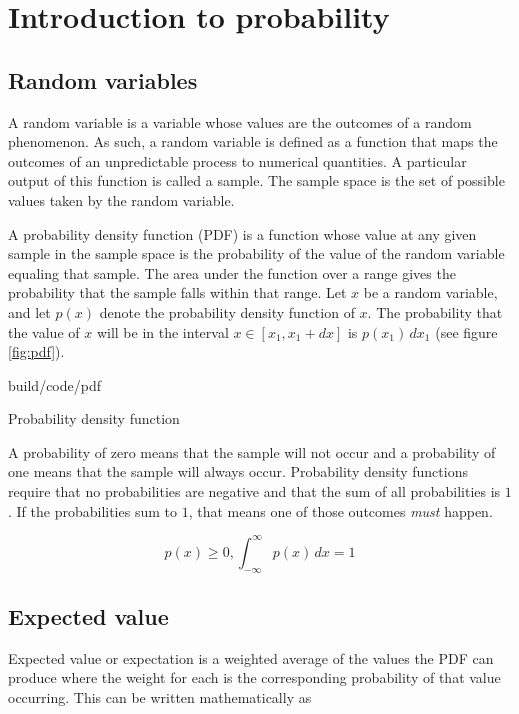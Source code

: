 \section{Introduction to probability}

\subsection{Random variables}

A random variable is a variable whose values are the outcomes of a random
phenomenon. As such, a random variable is defined as a function that maps the
outcomes of an unpredictable process to numerical quantities. A particular
output of this function is called a sample. The sample space is the set of
possible values taken by the random variable.

A probability density function (PDF) is a function whose value at any given
sample in the sample space is the probability of the value of the random
variable equaling that sample. The area under the function over a range gives
the probability that the sample falls within that range. Let $x$ be a random
variable, and let $p(x)$ denote the probability density function of $x$. The
probability that the value of $x$ will be in the interval
$x \in [x_1, x_1 + dx]$ is $p(x_1) \,dx_1$ (see figure \ref{fig:pdf}).

\begin{svg}{build/code/pdf}
  \caption{Probability density function}
  \label{fig:pdf}
\end{svg}

A probability of zero means that the sample will not occur and a probability of
one means that the sample will always occur. Probability density functions
require that no probabilities are negative and that the sum of all probabilities
is $1$. If the probabilities sum to $1$, that means one of those outcomes
\textit{must} happen.

\begin{equation*}
  p(x) \geq 0, \int_{-\infty}^\infty p(x) \,dx = 1
\end{equation*}

\subsection{Expected value}

Expected value or expectation is a weighted average of the values the PDF can
produce where the weight for each is the corresponding probability of that value
occurring. This can be written mathematically as

